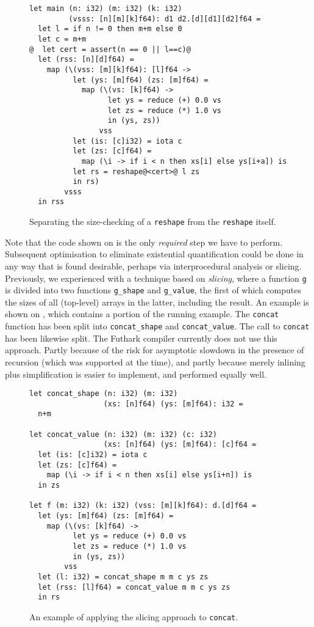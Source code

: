 \begin{figure}
\begin{lstlisting}
let main (n: i32) (m: i32) (k: i32)
         (vsss: [n][m][k]f64): d1 d2.[d][d1][d2]f64 =
  let l = if n != 0 then m+m else 0
  let c = m+m
@  let cert = assert(n == 0 || l==c)@
  let (rss: [n][d]f64) =
    map (\(vss: [m][k]f64): [l]f64 ->
          let (ys: [m]f64) (zs: [m]f64) =
            map (\(vs: [k]f64) ->
                  let ys = reduce (+) 0.0 vs
                  let zs = reduce (*) 1.0 vs
                  in (ys, zs))
                vss
          let (is: [c]i32) = iota c
          let (zs: [c]f64) =
            map (\i -> if i < n then xs[i] else ys[i+a]) is
          let rs = reshape@<cert>@ l zs
          in rs)
        vsss
  in rss
\end{lstlisting}

  \caption{Separating the size-checking of a \lstinline{reshape} from
    the \lstinline{reshape} itself.}
\label{fig:SimplifyFShapeCert}
\end{figure}

Note that the code shown on  is the only
\textit{required} step we have to perform.  Subsequent optimisation to
eliminate existential quantification could be done in any way that is
found desirable, perhaps via interprocedural analysis or slicing.
Previously, we experienced with a technique based on \textit{slicing},
where a function \lstinline{g} is divided into two functions
\lstinline{g_shape} and \lstinline{g_value}, the first of which
computes the sizes of all (top-level) arrays in the latter, including
the result.  An example is shown on ,
which contains a portion of the running example.  The
\lstinline{concat} function has been split into
\lstinline{concat_shape} and \lstinline{concat_value}. The call to
\lstinline{concat} has been likewise split.  The Futhark compiler
currently does not use this approach.  Partly because of the risk for
asymptotic slowdown in the presence of recursion (which was supported
at the time), and partly because merely inlining plus simplification
is easier to implement, and performed equally well.

\begin{figure}

\begin{lstlisting}
let concat_shape (n: i32) (m: i32)
                 (xs: [n]f64) (ys: [m]f64): i32 =
  n+m

let concat_value (n: i32) (m: i32) (c: i32)
                 (xs: [n]f64) (ys: [m]f64): [c]f64 =
  let (is: [c]i32) = iota c
  let (zs: [c]f64) =
    map (\i -> if i < n then xs[i] else ys[i+n]) is
  in zs

let f (m: i32) (k: i32) (vss: [m][k]f64): d.[d]f64 =
  let (ys: [m]f64) (zs: [m]f64) =
    map (\(vs: [k]f64) ->
          let ys = reduce (+) 0.0 vs
          let zs = reduce (*) 1.0 vs
          in (ys, zs))
        vss
  let (l: i32) = concat_shape m m c ys zs
  let (rss: [l]f64) = concat_value m m c ys zs
  in rs
\end{lstlisting}

  \caption{An example of applying the slicing approach to \lstinline{concat}.}
  \label{fig:FShapeSlice}
\end{figure}

